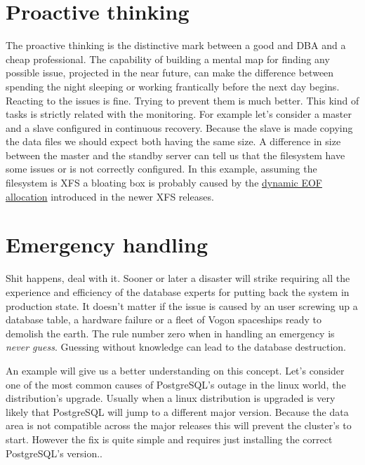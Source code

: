 \section{Proactive thinking}
The proactive thinking is the distinctive mark between a good and DBA and a cheap professional. The 
capability of building a mental map for finding any possible issue, projected in the near future, can 
make the difference between spending the night sleeping or working frantically before the next day begins. 
Reacting to the issues is fine. Trying to prevent them is much better. This kind of tasks is strictly 
related with the monitoring. For example let's consider a master and a slave configured in continuous 
recovery. Because the slave is made copying the data files we should expect both having the same size. 
A difference in size between the master and the standby server can tell us that the filesystem have some 
issues or is not correctly configured. In this example, assuming the filesystem is XFS a bloating box is 
probably caused by the \href{
http://serverfault.com/questions/406069/why-are-my-xfs-filesystems-suddenly-consuming-more-space-and-full-of
-sparse-file}{dynamic EOF allocation} introduced in the newer XFS releases.

\section{Emergency handling}
Shit happens, deal with it. Sooner or later a disaster will strike requiring all the experience and 
efficiency of the database experts for putting back the system in production state. It doesn't matter if 
the issue is caused by an user screwing up a database table, a hardware failure or a fleet of Vogon 
spaceships ready to demolish the earth. The rule number zero when in handling an emergency is \textit{never 
guess}. Guessing without knowledge can lead to the database destruction.\newline

An example will give us a better understanding on this concept. Let's consider one of the most common 
causes of PostgreSQL's outage in the linux world, the distribution's upgrade. Usually when a linux 
distribution is upgraded is very likely that PostgreSQL will jump to a different major version. 
Because the data area is not compatible across the major releases this will prevent the cluster's to start. 
However the fix is quite simple and requires just installing the correct PostgreSQL's version.\newline.


